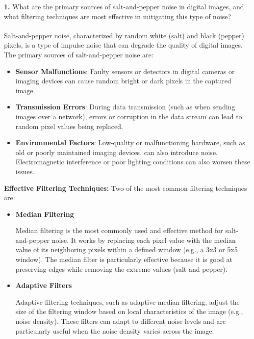 \documentclass[hidelinks,12pt]{article}
\begin{document}
	 \textbf{1.} What are the primary sources of salt-and-pepper noise in digital images, and what filtering techniques are most effective in mitigating this type of noise?
	\\ \\
	Salt-and-pepper noise, characterized by random white (salt) and black (pepper) pixels, is a type of impulse noise that can degrade the quality of digital images. The primary sources of salt-and-pepper noise are:
	\begin{itemize}
		\item \textbf{Sensor Malfunctions}: Faulty sensors or detectors in digital cameras or imaging devices can cause random bright or dark pixels in the captured image.
		\item \textbf{Transmission Errors}: During data transmission (such as when sending images over a network), errors or corruption in the data stream can lead to random pixel values being replaced.
		\item \textbf{Environmental Factors}: Low-quality or malfunctioning hardware, such as old or poorly maintained imaging devices, can also introduce noise. Electromagnetic interference or poor lighting conditions can also worsen these issues.
	\end{itemize}
	
	 \textbf{Effective Filtering Techniques:} Two of the most common filtering techniques are:
	
	\begin{itemize}
		\item \textbf{Median Filtering}
		
		Median filtering is the most commonly used and effective method for salt-and-pepper noise. It works by replacing each pixel value with the median value of its neighboring pixels within a defined window (e.g., a 3x3 or 5x5 window). The median filter is particularly effective because it is good at preserving edges while removing the extreme values (salt and pepper).
		
		\item \textbf{Adaptive Filters}
		
		Adaptive filtering techniques, such as adaptive median filtering, adjust the size of the filtering window based on local characteristics of the image (e.g., noise density). These filters can adapt to different noise levels and are particularly useful when the noise density varies across the image.
		
		
	\end{itemize}
	
\end{document}
